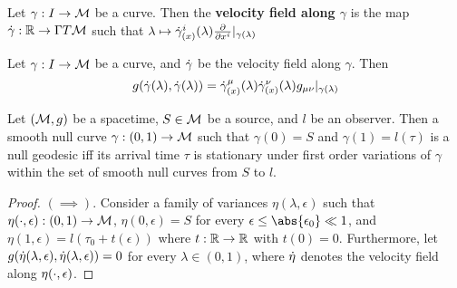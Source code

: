 \begin{definition}[]\label{}
Let $\gamma: I \to \mathcal{M}$ be a curve. Then the \textbf{velocity field along $\gamma$} is the map $\dot{\gamma}: \mathbb{R} \to \Gamma T \mathcal{M}$ such that $\lambda \mapsto \vg_{(x)}^i (\lambda) \ddx{i} \rvert_{\gamma(\lambda)}$
\end{definition}

\begin{proposition}[]\label{}
Let $\gamma: I \to \mathcal{M}$ be a curve, and $\dot{\gamma}$ be the velocity field along $\gamma$. Then
\begin{equation}\label{}
g(\dot{\gamma}(\lambda), \dot{\gamma}(\lambda)) = \dot{\gamma}_{(x)}^{\mu}(\lambda) \dot{\gamma}_{(x)}^{\nu}(\lambda) g_{\mu \nu} \rvert_{\gamma(\lambda)}
\end{equation}
\end{proposition}

\begin{theorem}\label{}
Let $(\mathcal{M}, g)$ be a spacetime, $S \in \mathcal{M}$ be a source, and $l$ be an observer. Then a smooth null curve $\gamma: (0,1) \to \mathcal{M}$ such that $\gamma(0) = S$ and $\gamma(1) = l(\tau)$ is a null geodesic iff its arrival time $\tau$ is stationary under first order variations of $\gamma$ within the set of smooth null curves from $S$ to $l$.
\end{theorem}
\begin{proof}
$(\implies)$. Consider a family of variances $\eta(\lambda, \epsilon)$ such that $\eta(\cdot, \epsilon) : (0,1) \to \mathcal{M}$, $\eta(0, \epsilon) = S$ for every $\eps \le \abs{\eps_0} \ll 1$, and $\eta(1, \epsilon) = l(\tau_0 + t(\epsilon))$ where $t: \mathbb{R} \to \mathbb{R}$
with $t(0)=0$. Furthermore, let $g(\dot{\eta}(\lambda, \epsilon), \dot{\eta}(\lambda, \epsilon)) = 0$ for every $\lambda \in (0,1)$, where $\dot{\eta}$ denotes the velocity field along $\eta(\cdot, \epsilon)$.  
\end{proof}
